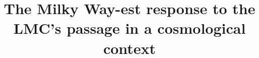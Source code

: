 \documentclass[twocolumn, linenumbers]{openjournal}
\begin{document}
\title{The Milky Way-est response to the LMC's passage in a cosmological context}




\end{document}
